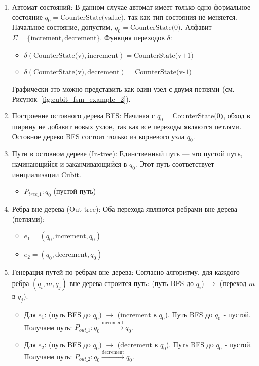 \documentclass[14pt, russian]{scrartcl}
\begin{document}
\begin{enumerate}
    \item {Автомат состояний:} В данном случае автомат имеет только одно формальное состояние $q_0 = \text{CounterState(value)}$, так как тип состояния не меняется. Начальное состояние, допустим, $q_0 = \text{CounterState(0)}$. Алфавит $\Sigma = \{ \text{increment}, \text{decrement} \}$. Функция переходов $\delta$:
        \begin{itemize}
            \item $\delta(\text{CounterState(v)}, \text{increment}) = \text{CounterState(v+1)}$
            \item $\delta(\text{CounterState(v)}, \text{decrement}) = \text{CounterState(v-1)}$
        \end{itemize}
        Графически это можно представить как один узел с двумя петлями (см. Рисунок~\ref{fig:cubit_fsm_example_2}).

    \item {Построение остовного дерева BFS:} Начиная с $q_0 = \text{CounterState(0)}$, обход в ширину не добавит новых узлов, так как все переходы являются петлями. Остовное дерево BFS состоит только из корневого узла $q_0$.

    \item {Пути в остовном дереве (In-tree):} Единственный путь — это пустой путь, начинающийся и заканчивающийся в $q_0$. Этот путь соответствует инициализации Cubit.
        \begin{itemize}
            \item $P_{tree\_1}: q_0$ (пустой путь)
        \end{itemize}

    \item {Ребра вне дерева (Out-tree):} Оба перехода являются ребрами вне дерева (петлями):
        \begin{itemize}
            \item $e_1 = (q_0, \text{increment}, q_0)$
            \item $e_2 = (q_0, \text{decrement}, q_0)$
        \end{itemize}

    \item {Генерация путей по ребрам вне дерева:} Согласно алгоритму, для каждого ребра $(q_i, m, q_j)$ вне дерева строится путь: (путь BFS до $q_i$) $\rightarrow$ (переход $m$ в $q_j$).
        \begin{itemize}
            \item Для $e_1$: (путь BFS до $q_0$) $\rightarrow$ (increment в $q_0$). Путь BFS до $q_0$ - пустой. Получаем путь: $P_{out\_1}: q_0 \xrightarrow{\text{increment}} q_0$.
            \item Для $e_2$: (путь BFS до $q_0$) $\rightarrow$ (decrement в $q_0$). Путь BFS до $q_0$ - пустой. Получаем путь: $P_{out\_2}: q_0 \xrightarrow{\text{decrement}} q_0$.
        \end{itemize}


\end{enumerate}
\end{document}
